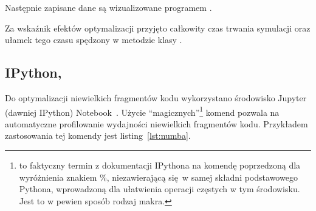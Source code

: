 Następnie zapisane dane są wizualizowane programem .

Za wskaźnik efektów optymalizacji przyjęto całkowity czas trwania symulacji
oraz ułamek tego czasu spędzony w metodzie  klasy .
\subsection{IPython, }
Do optymalizacji niewielkich fragmentów kodu wykorzystano środowisko Jupyter (dawniej IPython) Notebook~\cite{jupyter}.
Użycie ``magicznych''\footnote{ to faktyczny termin z
dokumentacji IPythona na komendę poprzedzoną dla wyróżnienia znakiem \%,
niezawierającą się w samej składni podstawowego Pythona, wprowadzoną dla
ułatwienia operacji częstych w tym środowisku. Jest to w pewien sposób rodzaj
makra.} komend 
pozwala na automatyczne profilowanie wydajności niewielkich fragmentów kodu.
Przykładem zastosowania tej komendy jest listing~\ref{lst:numba}.
